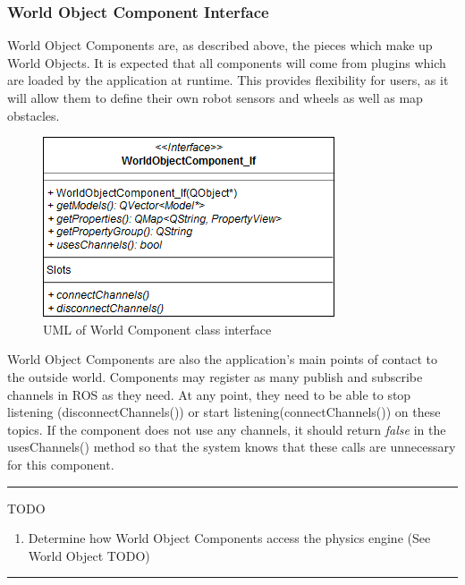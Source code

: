   \subsubsection*{World Object Component Interface}
  World Object Components are, as described above, the pieces which make up World Objects. It is expected that all components will come from plugins which are loaded by the application at runtime. This provides flexibility for users, as it will allow them to define their own robot sensors and wheels as well as map obstacles.
 \begin{figure}
 	\begin{center}
 	\includegraphics[scale=0.5]{./images_design/uml/WorldComponent_If}
 	\caption{UML of World Component class interface\label{uml:worldcomponent_if}}
 	\end{center}
 \end{figure} 
 World Object Components are also the application's main points of contact to the outside world. Components may register as many publish and subscribe channels in ROS as they need. At any point, they need to be able to stop listening (disconnectChannels()) or start listening(connectChannels()) on these topics. If the component does not use any channels, it should return \textit{false} in the usesChannels() method so that the system knows that these calls are unnecessary for this component.
 \hrule
 TODO
 \begin{enumerate}
 	\item Determine how World Object Components access the physics engine (See World Object TODO)
 \end{enumerate}
 \hrule
